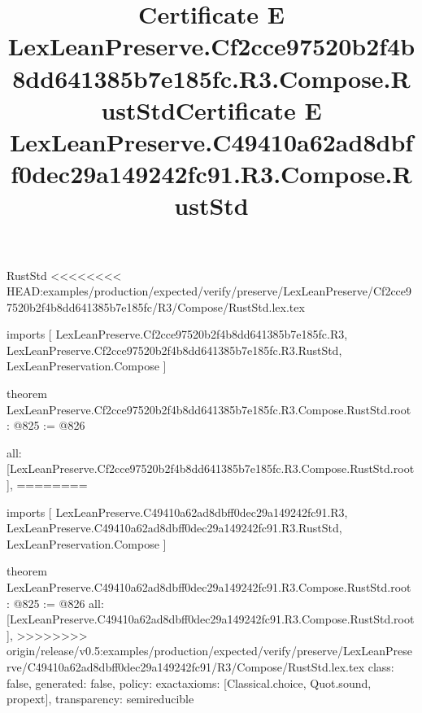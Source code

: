 \begin{lexlean}{RustStd}
<<<<<<<< HEAD:examples/production/expected/verify/preserve/LexLeanPreserve/Cf2cce97520b2f4b8dd641385b7e185fc/R3/Compose/RustStd.lex.tex
\title{Certificate E LexLeanPreserve.Cf2cce97520b2f4b8dd641385b7e185fc.R3.Compose.RustStd}
\begin{coremodule}
imports [
  LexLeanPreserve.Cf2cce97520b2f4b8dd641385b7e185fc.R3,
  LexLeanPreserve.Cf2cce97520b2f4b8dd641385b7e185fc.R3.RustStd,
  LexLeanPreservation.Compose
]

theorem LexLeanPreserve.Cf2cce97520b2f4b8dd641385b7e185fc.R3.Compose.RustStd.root : @825 := @826 {
  all: [LexLeanPreserve.Cf2cce97520b2f4b8dd641385b7e185fc.R3.Compose.RustStd.root],
========
\title{Certificate E LexLeanPreserve.C49410a62ad8dbff0dec29a149242fc91.R3.Compose.RustStd}
\begin{coremodule}
imports [
  LexLeanPreserve.C49410a62ad8dbff0dec29a149242fc91.R3,
  LexLeanPreserve.C49410a62ad8dbff0dec29a149242fc91.R3.RustStd,
  LexLeanPreservation.Compose
]

theorem LexLeanPreserve.C49410a62ad8dbff0dec29a149242fc91.R3.Compose.RustStd.root : @825 := @826 {
  all: [LexLeanPreserve.C49410a62ad8dbff0dec29a149242fc91.R3.Compose.RustStd.root],
>>>>>>>> origin/release/v0.5:examples/production/expected/verify/preserve/LexLeanPreserve/C49410a62ad8dbff0dec29a149242fc91/R3/Compose/RustStd.lex.tex
  class: false,
  generated: false,
  policy: exact{axioms: [Classical.choice, Quot.sound, propext]},
  transparency: semireducible
}


\end{coremodule}}
\end{coremodule}
\end{lexlean}

